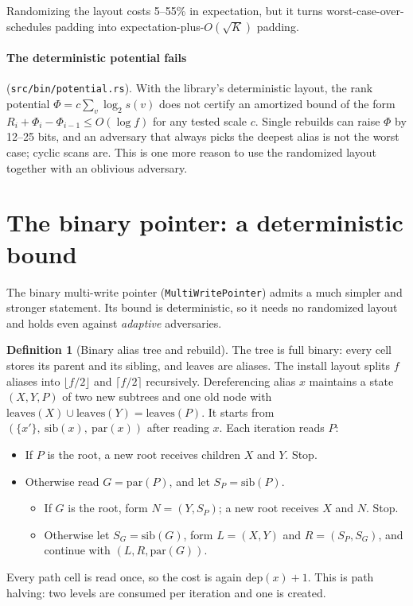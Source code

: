 \documentclass[11pt]{article}
\theoremstyle{definition}
\newtheorem{definition}[theorem]{Definition}
\newcommand{\dep}{\mathrm{dep}}
\begin{document}
\noindent Randomizing the layout costs 5--55\% in expectation, but it turns
worst-case-over-schedules padding into expectation-plus-$O(\sqrt K)$ padding.

\paragraph{The deterministic potential fails} (\texttt{src/bin/potential.rs}).
With the library's deterministic layout, the rank potential
$\Phi=c\sum_v\log_2 s(v)$ does not certify an amortized bound of the form
$R_i+\Phi_i-\Phi_{i-1}\le O(\log f)$ for any tested scale $c$. Single rebuilds
can raise $\Phi$ by 12--25 bits, and an adversary that always picks the deepest
alias is not the worst case; cyclic scans are. This is one more reason to use
the randomized layout together with an oblivious adversary.


\section{The binary pointer: a deterministic bound}

The binary multi-write pointer (\texttt{MultiWritePointer}) admits a much
simpler and stronger statement. Its bound is deterministic, so it needs no
randomized layout and holds even against \emph{adaptive} adversaries.

\begin{definition}[Binary alias tree and rebuild]
The tree is full binary: every cell stores its parent and its sibling, and
leaves are aliases. The install layout splits $f$ aliases into
$\lfloor f/2\rfloor$ and $\lceil f/2\rceil$ recursively. Dereferencing alias
$x$ maintains a state $(X,Y,P)$ of two new subtrees and one old node with
$\mathrm{leaves}(X)\cup\mathrm{leaves}(Y)=\mathrm{leaves}(P)$. It starts from
$(\{x'\},\ \mathrm{sib}(x),\ \mathrm{par}(x))$ after reading $x$. Each
iteration reads $P$:
\begin{itemize}
\item If $P$ is the root, a new root receives children $X$ and $Y$. Stop.
\item Otherwise read $G=\mathrm{par}(P)$, and let $S_P=\mathrm{sib}(P)$.
  \begin{itemize}
  \item If $G$ is the root, form $N=(Y,S_P)$; a new root receives $X$ and $N$. Stop.
  \item Otherwise let $S_G=\mathrm{sib}(G)$, form $L=(X,Y)$ and $R=(S_P,S_G)$, and continue with $(L,R,\mathrm{par}(G))$.
  \end{itemize}
\end{itemize}
Every path cell is read once, so the cost is again $\dep(x)+1$. This is
path halving: two levels are consumed per iteration and one is created.
\end{definition}
\end{document}
